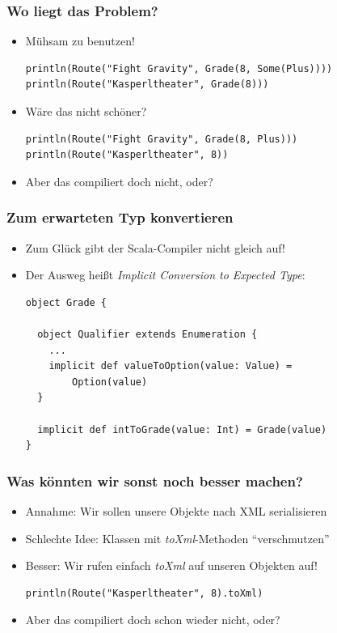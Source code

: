 \documentclass{beamer}
\begin{document}
\begin{frame}[fragile]
  \frametitle{Wo liegt das Problem?}
  \begin{itemize}
    \item M\"uhsam zu benutzen!
    \begin{lstlisting}
println(Route("Fight Gravity", Grade(8, Some(Plus))))
println(Route("Kasperltheater", Grade(8)))
    \end{lstlisting}
    \item W\"are das nicht sch\"oner?
    \begin{lstlisting}
println(Route("Fight Gravity", Grade(8, Plus)))
println(Route("Kasperltheater", 8))
    \end{lstlisting}
    \item Aber das compiliert doch nicht, oder?
  \end{itemize}
\end{frame}

\begin{frame}[fragile]
  \frametitle{Zum erwarteten Typ konvertieren}
  \begin{itemize}
    \item Zum Gl\"uck gibt der Scala-Compiler nicht gleich auf!
    \item Der Ausweg hei{\ss}t \emph{Implicit Conversion to Expected Type}:
    \begin{lstlisting}
object Grade {

  object Qualifier extends Enumeration {
    ...
    implicit def valueToOption(value: Value) =
        Option(value)
  }

  implicit def intToGrade(value: Int) = Grade(value)
}
    \end{lstlisting}
  \end{itemize}
\end{frame}

\begin{frame}[fragile]
  \frametitle{Was k\"onnten wir sonst noch besser machen?}
  \begin{itemize}
    \item Annahme: Wir sollen unsere Objekte nach XML serialisieren
    \item Schlechte Idee: Klassen mit \emph{toXml}-Methoden ``verschmutzen''
    \item Besser: Wir rufen einfach \emph{toXml} auf unseren Objekten auf!
    \begin{lstlisting}
println(Route("Kasperltheater", 8).toXml)
    \end{lstlisting}
    \item Aber das compiliert doch schon wieder nicht, oder?
  \end{itemize}
\end{frame}
\end{document}
